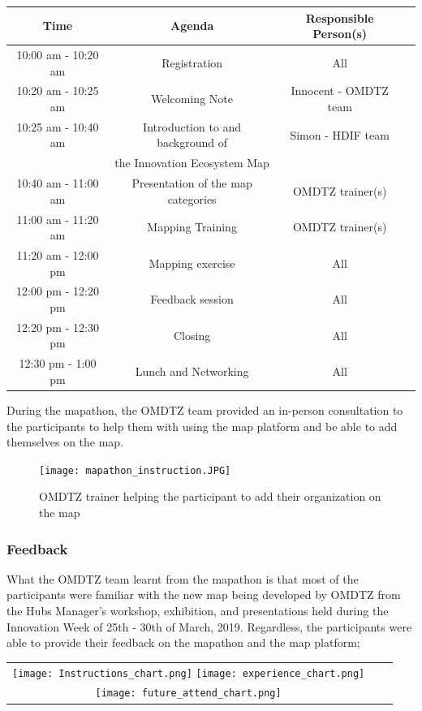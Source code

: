 \documentclass[a4paper,12pt,twoside]{article}
\begin{document}
\begin{tabular}{|c|c|c|c|}
	\hline
	\rowcolor{Gray}
	\bfseries Time & Agenda & Responsible Person(s)\\
	\hline
	10:00 am - 10:20 am & Registration & All\\
	\hline
	10:20 am - 10:25 am & Welcoming Note & Innocent - OMDTZ team\\
	\hline
	10:25 am - 10:40 am & Introduction to and background of & Simon - HDIF team\\
	{} &  the Innovation Ecosystem Map & {}\\
	\hline
	10:40 am - 11:00 am	& Presentation of the map categories & OMDTZ trainer(s)\\
	\hline
	11:00 am - 11:20 am & Mapping Training & OMDTZ trainer(s)\\
	\hline
	11:20 am - 12:00 pm & Mapping exercise & All\\
	\hline
	12:00 pm - 12:20 pm & Feedback session & All\\
	\hline
	12:20 pm - 12:30 pm & Closing & All\\
	\hline
	12:30 pm - 1:00 pm & Lunch and Networking & All\\
	\hline
\end{tabular}

During the mapathon, the OMDTZ team provided an in-person consultation to the participants to help them with using the map platform and be able to add themselves on the map.
\begin{figure}
	\centering
	\texttt{[image: mapathon\_instruction.JPG]}
	\caption{OMDTZ trainer helping the participant to add their organization on the map}
\end{figure}

\subsubsection{Feedback}
What the OMDTZ team learnt from the mapathon is that most of the participants were familiar with the new map being developed by OMDTZ from the Hubs Manager’s workshop, exhibition, and presentations held during the Innovation Week of 25th - 30th of March, 2019. Regardless, the participants were able to provide their feedback on the mapathon and the map platform;

\begin{tabular}{c|c|c}
	\texttt{[image: Instructions\_chart.png]} \texttt{[image: experience\_chart.png]}\\
	\texttt{[image: future\_attend\_chart.png]}\\
\end{tabular}
\end{document}
